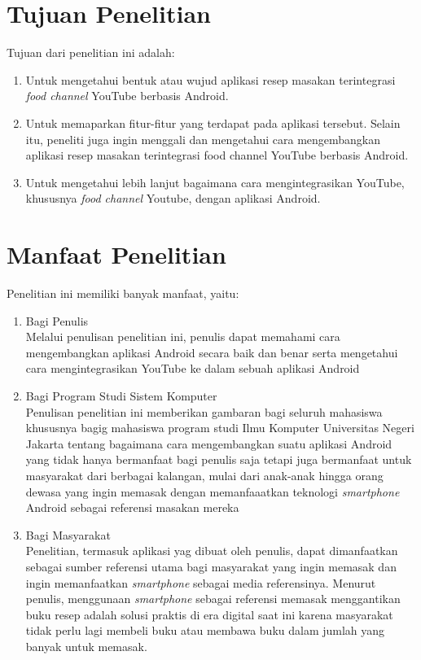 \section{Tujuan Penelitian}
Tujuan dari penelitian ini adalah: 
\begin{enumerate}
	\item Untuk mengetahui bentuk atau wujud aplikasi resep masakan terintegrasi \emph{food channel} YouTube berbasis Android. 
	\item Untuk memaparkan fitur-fitur yang terdapat pada aplikasi tersebut. Selain itu, peneliti juga ingin menggali dan mengetahui cara mengembangkan aplikasi resep masakan terintegrasi food channel YouTube berbasis Android. 
	\item Untuk mengetahui lebih lanjut bagaimana cara mengintegrasikan YouTube, khususnya \emph{food channel} Youtube, dengan aplikasi Android. 
\end{enumerate}

\section{Manfaat Penelitian}
Penelitian ini memiliki banyak manfaat, yaitu: 
	\begin{enumerate}
		\item Bagi Penulis\\
		Melalui penulisan penelitian ini, penulis dapat memahami cara mengembangkan aplikasi Android secara baik dan benar serta mengetahui cara mengintegrasikan YouTube ke dalam sebuah aplikasi Android
		\item Bagi Program Studi Sistem Komputer\\
		Penulisan penelitian ini memberikan gambaran bagi seluruh mahasiswa khususnya bagig mahasiswa program studi Ilmu Komputer Universitas Negeri Jakarta tentang bagaimana cara mengembangkan suatu aplikasi Android yang tidak hanya bermanfaat bagi penulis saja tetapi juga bermanfaat untuk masyarakat dari berbagai kalangan, mulai dari anak-anak hingga orang dewasa yang ingin memasak dengan memanfaaatkan teknologi \emph{smartphone} Android sebagai referensi masakan mereka  
		\item Bagi Masyarakat\\
		Penelitian, termasuk aplikasi yag dibuat oleh penulis, dapat dimanfaatkan sebagai sumber referensi utama bagi masyarakat yang ingin memasak dan ingin memanfaatkan \emph{smartphone} sebagai media referensinya.  Menurut penulis, menggunaan \emph{smartphone} sebagai referensi memasak menggantikan buku resep adalah solusi praktis di era digital saat ini karena masyarakat tidak perlu lagi membeli buku atau membawa buku dalam jumlah yang banyak untuk memasak.		
	\end{enumerate}

